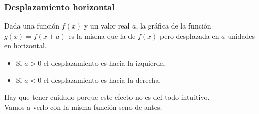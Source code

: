 \documentclass[a4paper,11pt,answers]{exam}
\begin{document}
\subsubsection{Desplazamiento horizontal}
Dada una función $f(x)$ y un valor real $a$, la gráfica de la función $g(x) = f(x+a)$ es la misma que la de $f(x)$ pero desplazada en $a$ unidades en horizontal.
\begin{itemize}
	\item Si $a>0$ el desplazamiento es hacia la izquierda.
	\item Si $a<0$ el desplazamiento es hacia la derecha.
\end{itemize}
Hay que tener cuidado porque este efecto no es del todo intuitivo.\\

Vamos a verlo con la misma función seno de antes:
\end{document}
